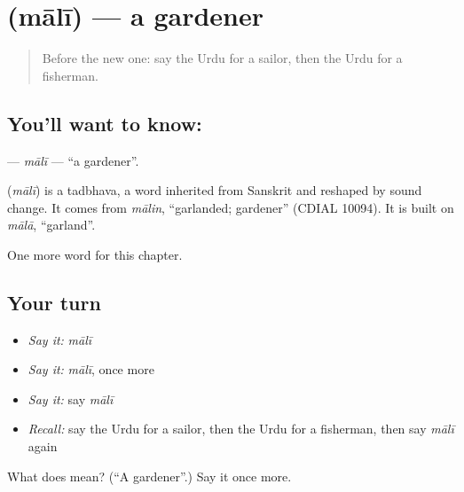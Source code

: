 \section[\texorpdfstring{\ur{مالی} (mālī)}{مالی (mālī)}]{ (mālī) — a gardener}

\label{lesson:UR-C178-mali}



\begin{quote}
Before the new one: say the Urdu for a sailor, then the Urdu for a fisherman.
\end{quote}

\subsection*{You'll want to know: }
\textbf{} — \emph{mālī} — \textquotedblleft{}a gardener\textquotedblright{}.

\begin{cousinweb}
\textbf{} (\emph{mālī}) is a tadbhava, a word inherited from Sanskrit and reshaped by sound change. It comes from \emph{mālin}, \textquotedblleft{}garlanded; gardener\textquotedblright{} (CDIAL 10094). It is built on \emph{mālā}, \textquotedblleft{}garland\textquotedblright{}.
\end{cousinweb}

\begin{grammarlens}[title={What you've built}]
One more word for this chapter.
\end{grammarlens}

\subsection*{Your turn}
\begin{itemize}
\raggedright
  \item \emph{Say it:} \emph{mālī}
  \item \emph{Say it:} \emph{mālī}, once more
  \item \emph{Say it:} say \emph{mālī}
  \item \emph{Recall:} say the Urdu for a sailor, then the Urdu for a fisherman, then say \emph{mālī} again
\end{itemize}

\begin{tcolorbox}[breakable,colback=teal!4,colframe=teal!35!black,title={Before you move on}]
What does  mean? (\textquotedblleft{}A gardener\textquotedblright{}.) Say it once more.
\end{tcolorbox}
